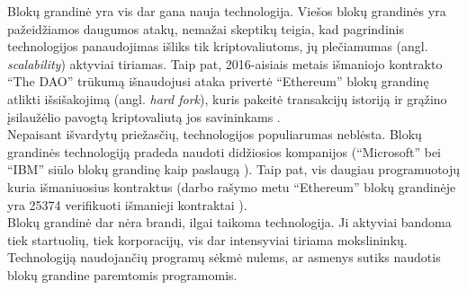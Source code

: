 Blokų grandinė yra vis dar gana nauja technologija. Viešos blokų grandinės yra pažeidžiamos daugumos atakų, nemažai skeptikų
teigia, kad pagrindinis technologijos panaudojimas išliks tik kriptovaliutoms, jų plečiamumas (angl. \textit{scalability}) aktyviai
tiriamas. Taip pat, 2016-aisiais metais išmaniojo kontrakto \enquote{The DAO} trūkumą išnaudojusi ataka privertė \enquote{Ethereum} 
blokų grandinę atlikti išsišakojimą (angl. \textit{hard fork}), kuris pakeitė transakcijų istoriją ir grąžino įsilaužėlio
pavogtą kriptovaliutą jos savininkams \cite{TheDAO}.\\
Nepaisant išvardytų priežasčių, technologijos populiarumas neblėsta. Blokų grandinės technologiją pradeda naudoti didžiosios kompanijos
(\enquote{Microsoft} bei \enquote{IBM} siūlo
blokų grandinę kaip paslaugą \cite{Zheng2017}). Taip pat, vis daugiau programuotojų kuria išmaniuosius kontraktus
(darbo rašymo metu \enquote{Ethereum} blokų grandinėje yra 25374 verifikuoti išmanieji kontraktai \cite{EthVerifiedContracts}).\\
Blokų grandinė dar nėra brandi, ilgai taikoma technologija. Ji aktyviai bandoma tiek startuolių, tiek
korporacijų, vis dar intensyviai tiriama mokslininkų. Technologiją naudojančių programų sėkmė nulems, ar asmenys
sutiks naudotis blokų grandine paremtomis programomis.




